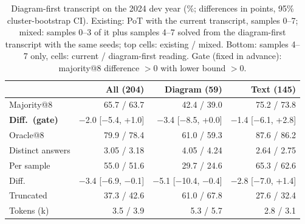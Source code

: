 \begin{table}[!t]
\centering
\scriptsize
\caption{Diagram-first transcript on the 2024 dev year (\%; differences in points, 95\% cluster-bootstrap CI). Existing: PoT with the current transcript, samples 0--7; mixed: samples 0--3 of it plus samples 4--7 solved from the diagram-first transcript with the same seeds; top cells: existing / mixed. Bottom: samples 4--7 only, cells: current / diagram-first reading. Gate (fixed in advance): majority@8 difference $>0$ with lower bound $>0$.}
\label{tab:v4bdiag}
\setlength{\tabcolsep}{2.5pt}
\begin{tabular}{lrrr}
\toprule
 & All (204) & Diagram (59) & Text (145) \\
\midrule
Majority@8 & 65.7 / 63.7 & 42.4 / 39.0 & 75.2 / 73.8 \\
\textbf{Diff.\ (gate)} & $-$2.0 [$-$5.4, +1.0] & $-$3.4 [$-$8.5, +0.0] & $-$1.4 [$-$6.1, +2.8] \\
Oracle@8 & 79.9 / 78.4 & 61.0 / 59.3 & 87.6 / 86.2 \\
Distinct answers & 3.05 / 3.18 & 4.05 / 4.24 & 2.64 / 2.75 \\
\midrule
Per sample & 55.0 / 51.6 & 29.7 / 24.6 & 65.3 / 62.6 \\
Diff. & $-$3.4 [$-$6.9, $-$0.1] & $-$5.1 [$-$10.4, $-$0.4] & $-$2.8 [$-$7.0, +1.4] \\
Truncated & 37.3 / 42.6 & 61.0 / 67.8 & 27.6 / 32.4 \\
Tokens (k) & 3.5 / 3.9 & 5.3 / 5.7 & 2.8 / 3.1 \\
\bottomrule
\end{tabular}
\end{table}
